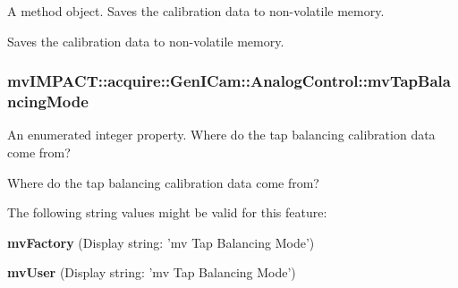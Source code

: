 A method object. Saves the calibration data to non-\/volatile memory. 

Saves the calibration data to non-\/volatile memory. \hypertarget{classmv_i_m_p_a_c_t_1_1acquire_1_1_gen_i_cam_1_1_analog_control_afaaf7d83e7278f824bec3635c01b8528}{
\subsubsection[{mv\+Tap\+Balancing\+Mode}]{ mv\+I\+M\+P\+A\+C\+T\+::acquire\+::\+Gen\+I\+Cam\+::\+Analog\+Control\+::mv\+Tap\+Balancing\+Mode}}\label{classmv_i_m_p_a_c_t_1_1acquire_1_1_gen_i_cam_1_1_analog_control_afaaf7d83e7278f824bec3635c01b8528}


An enumerated integer property. Where do the tap balancing calibration data come from? 

Where do the tap balancing calibration data come from?

The following string values might be valid for this feature\+:
\begin{DoxyItemize}
\item {\bfseries mv\+Factory} (Display string\+: 'mv Tap Balancing Mode')
\item {\bfseries mv\+User} (Display string\+: 'mv Tap Balancing Mode')
\end{DoxyItemize}

